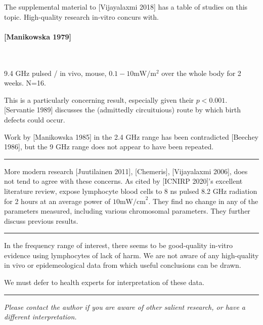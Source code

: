 \documentclass[paper.tex]{subfiles}
\begin{document}
\begin{multicols}{1}
The supplemental material to [Vijayalaxmi 2018] has a table of studies on this topic. High-quality research in-vitro concurs with.

\paragraph{[Manikowska 1979]} \

9.4 GHz pulsed / in vivo, mouse, $0.1-10 \text{mW}/\text{m}^2$ over the whole body for 2 weeks. N=16.

This is a particularly concerning result, especially given their $p<0.001$. [Servantie 1989] discusses the (admittedly circuituious) route by which birth defects could occur.

Work by [Manikowska 1985] in the 2.4 GHz range has been contradicted [Beechey 1986], but the 9 GHz range does not appear to have been repeated.

\rule{\linewidth}{0.2pt}

More modern research [Juutilainen 2011], [Chemeris], [Vijayalaxmi 2006],  does not tend to agree with these concerns. As cited by [ICNIRP 2020]'s excellent literature review, expose lymphocyte blood cells to 8 ns pulsed 8.2 GHz radiation for 2 hours at an average power of $10 \text{mW/cm}^2$. They find no change in any of the parameters measured, including various chromosomal parameters. They further discuss previous results.

\rule{\linewidth}{0.2pt}

In the frequency range of interest, there seems to be good-quality in-vitro evidence using lymphocytes of lack of harm. We are not aware of any high-quality in vivo or epidemeological data from which useful conclusions can be drawn. 

We must defer to health experts for interpretation of these data.

\rule{\linewidth}{0.2pt}

{\it Please contact the author if you are aware of other salient research, or have a different interpretation.}

\end{multicols}
\end{document}
